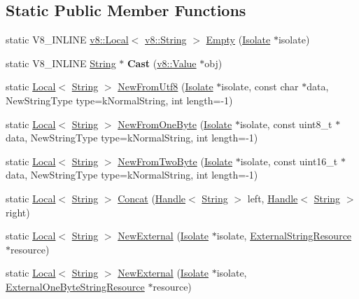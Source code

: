 \subsection*{Static Public Member Functions}
\begin{DoxyCompactItemize}
\item 
static V8\+\_\+\+I\+N\+L\+I\+N\+E \hyperlink{classv8_1_1Local}{v8\+::\+Local}$<$ \hyperlink{classv8_1_1String}{v8\+::\+String} $>$ \hyperlink{classv8_1_1String_aa393d47baa54467fe57001065e49194b}{Empty} (\hyperlink{classv8_1_1Isolate}{Isolate} $\ast$isolate)
\item 
\hypertarget{classv8_1_1String_a826d60798dc152cea64a7636737b03b9}{}static V8\+\_\+\+I\+N\+L\+I\+N\+E \hyperlink{classv8_1_1String}{String} $\ast$ {\bfseries Cast} (\hyperlink{classv8_1_1Value}{v8\+::\+Value} $\ast$obj)\label{classv8_1_1String_a826d60798dc152cea64a7636737b03b9}

\item 
static \hyperlink{classv8_1_1Local}{Local}$<$ \hyperlink{classv8_1_1String}{String} $>$ \hyperlink{classv8_1_1String_aa4b8c052f5108ca6350c45922602b9d4}{New\+From\+Utf8} (\hyperlink{classv8_1_1Isolate}{Isolate} $\ast$isolate, const char $\ast$data, New\+String\+Type type=k\+Normal\+String, int length=-\/1)
\item 
static \hyperlink{classv8_1_1Local}{Local}$<$ \hyperlink{classv8_1_1String}{String} $>$ \hyperlink{classv8_1_1String_afa8026ed1337564a9fd15dc56aceaa83}{New\+From\+One\+Byte} (\hyperlink{classv8_1_1Isolate}{Isolate} $\ast$isolate, const uint8\+\_\+t $\ast$data, New\+String\+Type type=k\+Normal\+String, int length=-\/1)
\item 
static \hyperlink{classv8_1_1Local}{Local}$<$ \hyperlink{classv8_1_1String}{String} $>$ \hyperlink{classv8_1_1String_a876615eb027092a6a71a4e7d69b82d00}{New\+From\+Two\+Byte} (\hyperlink{classv8_1_1Isolate}{Isolate} $\ast$isolate, const uint16\+\_\+t $\ast$data, New\+String\+Type type=k\+Normal\+String, int length=-\/1)
\item 
static \hyperlink{classv8_1_1Local}{Local}$<$ \hyperlink{classv8_1_1String}{String} $>$ \hyperlink{classv8_1_1String_a3d0b9c9208cf5054adb048e360fb73ff}{Concat} (\hyperlink{classv8_1_1Handle}{Handle}$<$ \hyperlink{classv8_1_1String}{String} $>$ left, \hyperlink{classv8_1_1Handle}{Handle}$<$ \hyperlink{classv8_1_1String}{String} $>$ right)
\item 
static \hyperlink{classv8_1_1Local}{Local}$<$ \hyperlink{classv8_1_1String}{String} $>$ \hyperlink{classv8_1_1String_a5574e60f0000c5042cf558f145a8aba2}{New\+External} (\hyperlink{classv8_1_1Isolate}{Isolate} $\ast$isolate, \hyperlink{classv8_1_1String_1_1ExternalStringResource}{External\+String\+Resource} $\ast$resource)
\item 
static \hyperlink{classv8_1_1Local}{Local}$<$ \hyperlink{classv8_1_1String}{String} $>$ \hyperlink{classv8_1_1String_ae1fa35fa433c24bb50c9edf7fbc3604b}{New\+External} (\hyperlink{classv8_1_1Isolate}{Isolate} $\ast$isolate, \hyperlink{classv8_1_1String_1_1ExternalOneByteStringResource}{External\+One\+Byte\+String\+Resource} $\ast$resource)
\end{DoxyCompactItemize}


